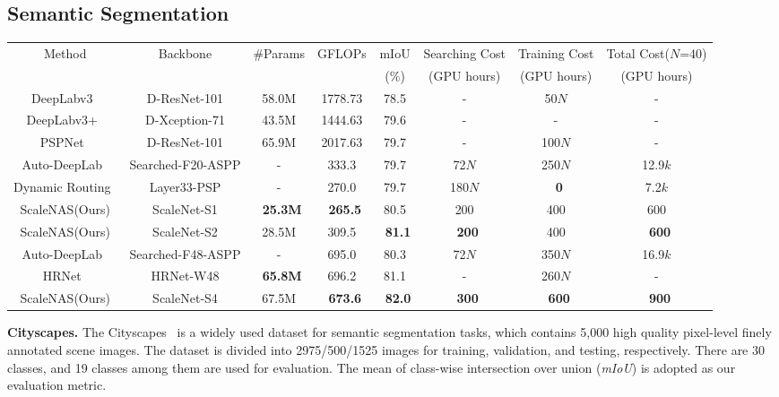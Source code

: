 \documentclass[final]{cvpr}
\newcommand{\workname}{ScaleNAS\xspace}
\newcommand{\netname}{ScaleNet\xspace}
\begin{document}
\subsection{Semantic Segmentation}
\label{sec:semantic_seg}
\begin{table*}
\centering
\caption{Semantic segmentation results on Cityscapes \textit{val} (single scale and no flipping). The GFLOPs is calculated on the input size 1024 × 2048. `D-X' equals to `Dilated-X'. For existing segmentation NAS works, the total cost grows linear to the number of deployment scenarios $N$, while the cost of our \workname remains constant.} 
\setlength{\tabcolsep}{4pt}
\small
\begin{tabular}{c||c|c|c|c||c|c|c} 
\hline
\multirow{2}{*}{Method}   & \multirow{2}{*}{Backbone} &  \multirow{2}{*}{\#Params}  & \multirow{2}{*}{GFLOPs} & mIoU  & Searching Cost & Training Cost & Total Cost($N$=40)        \\ 
   &  &   &  & (\%)  & (GPU hours) & (GPU hours) & (GPU hours)      \\ 
\hline \hline
DeepLabv3~\cite{chen2017rethinking} & D-ResNet-101 &  58.0M &  1778.73 &  78.5 & - & 50$N$ & - \\
DeepLabv3+~\cite{chen2018encoder}& D-Xception-71 &  43.5M &  1444.63 &  79.6 & - & - & - \\
PSPNet~\cite{zhao2017pyramid} & D-ResNet-101 &  65.9M &  2017.63 &  79.7 & - & 100$N$ & - \\
Auto-DeepLab~\cite{liu2019auto} & Searched-F20-ASPP & - & 333.3 & 79.7 & 72$N$ & 250$N$ & 12.9$k$ \\
Dynamic Routing~\cite{li2020learning} & Layer33-PSP & - & 270.0 & 79.7 & 180$N$ & ~\textbf{0} & 7.2$k$  \\
\workname(Ours) & \netname-S1   & ~\textbf{25.3M}    & ~\textbf{265.5}  & 80.5 & 200 &  400 & 600 \\
\workname(Ours) & \netname-S2   & 28.5M    & 309.5  & ~\textbf{81.1} & ~\textbf{200} &  400 & ~\textbf{600} \\
\hdashline
Auto-DeepLab~\cite{liu2019auto} & Searched-F48-ASPP & - & 695.0 & 80.3 & 72$N$ & 350$N$ & 16.9$k$ \\
HRNet~\cite{wang2020deep}       & HRNet-W48       & ~\textbf{65.8M}  & 696.2  & 81.1  & - &  260$N$  & -\\
\workname(Ours) & \netname-S4   & 67.5M                     & ~\textbf{673.6}  & ~\textbf{82.0} &  ~\textbf{300} & ~\textbf{600} & ~\textbf{900} \\

\hline
\end{tabular}
\label{tab:segmentation}
\end{table*}
\noindent\textbf{Cityscapes.} The Cityscapes~\cite{cordts2016cityscapes} is a widely used dataset for semantic segmentation tasks, which contains 5,000 high quality pixel-level finely annotated scene images. The dataset is divided into 2975/500/1525 images for training, validation, and testing, respectively. There are 30 classes, and 19 classes among them are used for evaluation. The mean of class-wise intersection over union (\textit{mIoU}) is adopted as our evaluation metric. 
\end{document}
